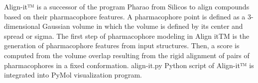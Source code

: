 Align-it™ is a successor of the program Pharao from Silicos to align compounds based on their pharmacophore features. A pharmacophore point is defined as a 3-dimensional Gaussian volume in which the volume is defined by its center and spread or sigma.
The first step of pharmacophore modeling in Align itTM is the generation of pharmacophore features from input structures. Then, a score is computed from the volume overlap resulting from the rigid alignment of pairs of pharmacophores in a fixed conformation. align-it.py Python script of Align-it™ is integrated into PyMol visualization program.
